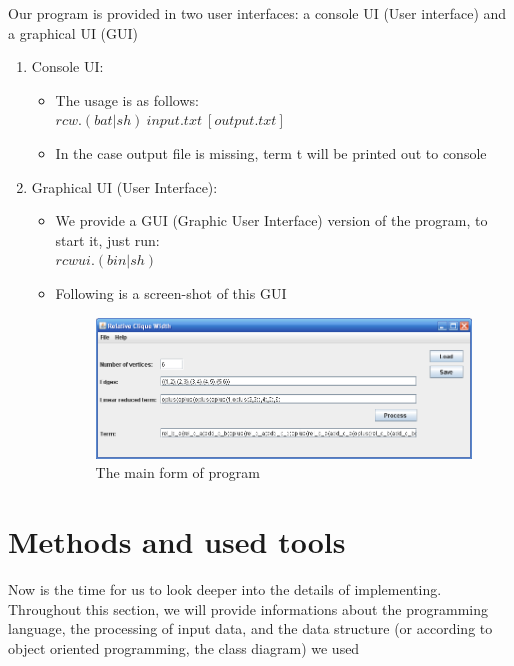 \documentclass[a4paper, 12pt]{article}
\begin{document}
Our program is provided in two user interfaces: a console UI (User interface) and a graphical UI (GUI)
\begin{enumerate}
\item Console UI:
\begin{itemize}
\item The usage is as follows:\\
{$rcw.(bat|sh)\ input.txt\ [output.txt]$}

\item In the case output file is missing, term t will be printed out to
console 
\end{itemize}

\item Graphical UI (User Interface):
\begin{itemize}
\item We provide a GUI (Graphic User Interface) version of the program, to start it, just run:\\
{$rcwui.(bin|sh)$}
\item Following is a screen-shot of this GUI\\

\begin{figure}[H]
\begin{centering}
\includegraphics [width=15cm]{image/MainUi.PNG}
\caption{The main form of program}
\par\end{centering}

\end{figure}

\end{itemize}
\end{enumerate}

\section {Methods and used tools}
Now is the time for us to look deeper into the details of implementing. Throughout this section, we will provide informations about the programming language, the processing of input data, and the data structure (or according to object oriented programming, the class diagram) we used
\end{document}
